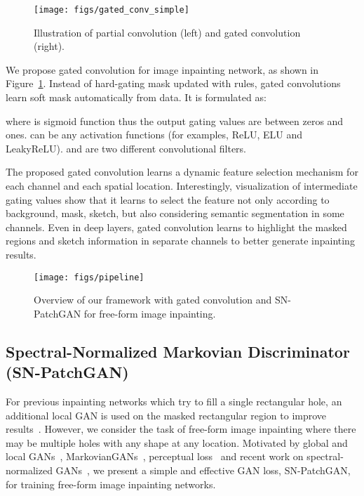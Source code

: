 \documentclass[10pt,twocolumn,letterpaper]{article}
\begin{document}
\begin{figure}[h]
  \centering
  \texttt{[image: figs/gated\_conv\_simple]}
  \caption{Illustration of partial convolution (left) and gated convolution (right).}
  \label{figs:gated_conv}
\end{figure}

We propose gated convolution for image inpainting network, as shown in Figure~\ref{figs:gated_conv}. Instead of hard-gating mask updated with rules, gated convolutions learn soft mask automatically from data. It is formulated as:

where  is sigmoid function thus the output gating values are between zeros and ones.  can be any activation functions (for examples, ReLU, ELU and LeakyReLU).  and  are two different convolutional filters.

The proposed gated convolution learns a dynamic feature selection mechanism for each channel and each spatial location. Interestingly, visualization of intermediate gating values show that it learns to select the feature not only according to background, mask, sketch, but also considering semantic segmentation in some channels. Even in deep layers, gated convolution learns to highlight the masked regions and sketch information in separate channels to better generate inpainting results.

\begin{figure*}[ht]
  \centering
  \texttt{[image: figs/pipeline]}
  \vspace*{-6mm}
  \caption{Overview of our framework with gated convolution and SN-PatchGAN for free-form image inpainting.}
  \label{figs:pipeline}
\end{figure*}



\subsection{Spectral-Normalized Markovian Discriminator (SN-PatchGAN)}
For previous inpainting networks which try to fill a single rectangular hole, an additional local GAN is used on the masked rectangular region to improve results~\cite{iizuka2017globally, yu2018generative}. However, we consider the task of free-form image inpainting where there may be multiple holes with any shape at any location. Motivated by global and local GANs~\cite{iizuka2017globally}, MarkovianGANs~\cite{isola2017image, li2016precomputed}, perceptual loss~\cite{johnson2016perceptual} and recent work on spectral-normalized GANs~\cite{miyato2018spectral}, we present a simple and effective GAN loss, SN-PatchGAN, for training free-form image inpainting networks. 
\end{document}
